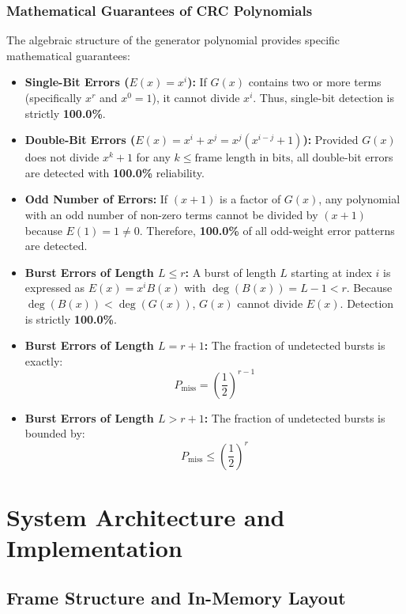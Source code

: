 \documentclass[11pt,a4paper]{article}
\begin{document}
\subsubsection{Mathematical Guarantees of CRC Polynomials}
The algebraic structure of the generator polynomial provides specific mathematical guarantees:
\begin{itemize}
    \item \textbf{Single-Bit Errors ($E(x) = x^i$):} If $G(x)$ contains two or more terms (specifically $x^r$ and $x^0 = 1$), it cannot divide $x^i$. Thus, single-bit detection is strictly \textbf{100.0\%}.
    \item \textbf{Double-Bit Errors ($E(x) = x^i + x^j = x^j(x^{i-j} + 1)$):} Provided $G(x)$ does not divide $x^k + 1$ for any $k \le \text{frame length in bits}$, all double-bit errors are detected with \textbf{100.0\%} reliability.
    \item \textbf{Odd Number of Errors:} If $(x + 1)$ is a factor of $G(x)$, any polynomial with an odd number of non-zero terms cannot be divided by $(x + 1)$ because $E(1) = 1 \neq 0$. Therefore, \textbf{100.0\%} of all odd-weight error patterns are detected.
    \item \textbf{Burst Errors of Length $L \le r$:} A burst of length $L$ starting at index $i$ is expressed as $E(x) = x^i B(x)$ with $\deg(B(x)) = L - 1 < r$. Because $\deg(B(x)) < \deg(G(x))$, $G(x)$ cannot divide $E(x)$. Detection is strictly \textbf{100.0\%}.
    \item \textbf{Burst Errors of Length $L = r + 1$:} The fraction of undetected bursts is exactly:
    \begin{equation}
        P_{\text{miss}} = \left(\frac{1}{2}\right)^{r-1}
    \end{equation}
    \item \textbf{Burst Errors of Length $L > r + 1$:} The fraction of undetected bursts is bounded by:
    \begin{equation}
        P_{\text{miss}} \le \left(\frac{1}{2}\right)^r
    \end{equation}
\end{itemize}

\section{System Architecture and Implementation}

\subsection{Frame Structure and In-Memory Layout}
\end{document}
